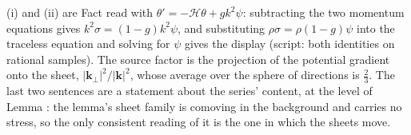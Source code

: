 (i) and (ii) are Fact  read with $\theta' = -\mathcal{H}\theta + gk^{2}\psi$: subtracting the two momentum equations gives $k^{2}\sigma = (1 - g)k^{2}\psi$, and substituting $\rho\sigma = \rho(1 - g)\psi$ into the traceless equation and solving for $\psi$ gives the display (script: both identities on rational samples). The source factor is the projection of the potential gradient onto the sheet, $|\mathbf{k}_{\perp}|^{2}/|\mathbf{k}|^{2}$, whose average over the sphere of directions is $\tfrac{2}{3}$. The last two sentences are a statement about the series' content, at the level of Lemma : the lemma's sheet family is comoving in the background and carries no stress, so the only consistent reading of it is the one in which the sheets move.
